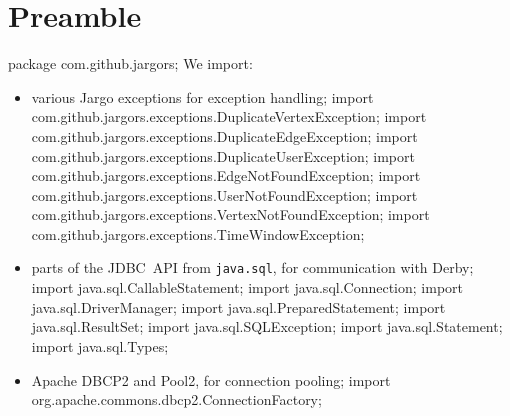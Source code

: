 \section{Preamble}
\nwenddocs{}\endmoddef{}
package com.github.jargors;
\nwendcode{}\nwdocspar
We import:
\begin{itemize}
\item various Jargo exceptions for exception handling;
\nwenddocs{}\plusendmoddef
import com.github.jargors.exceptions.DuplicateVertexException;
import com.github.jargors.exceptions.DuplicateEdgeException;
import com.github.jargors.exceptions.DuplicateUserException;
import com.github.jargors.exceptions.EdgeNotFoundException;
import com.github.jargors.exceptions.UserNotFoundException;
import com.github.jargors.exceptions.VertexNotFoundException;
import com.github.jargors.exceptions.TimeWindowException;
\nwendcode{}\item parts of the JDBC~API from {\tt{}java.sql}, for communication with Derby;
\nwenddocs{}\plusendmoddef
import java.sql.CallableStatement;   import java.sql.Connection;
import java.sql.DriverManager;       import java.sql.PreparedStatement;
import java.sql.ResultSet;           import java.sql.SQLException;
import java.sql.Statement;           import java.sql.Types;
\nwendcode{}\item Apache DBCP2 and Pool2, for connection pooling;
\nwenddocs{}\plusendmoddef
import org.apache.commons.dbcp2.ConnectionFactory;

\end{itemize}
